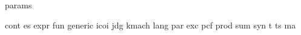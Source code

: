 {params}

{cont}
{es}
{expr}
{fun}
{generic}
{icoi}
{jdg}
{kmach}
{lang}
{par}
{exc}
{pcf}
{prod}
{sum}
{syn}
{t}
{ts}
{ma}